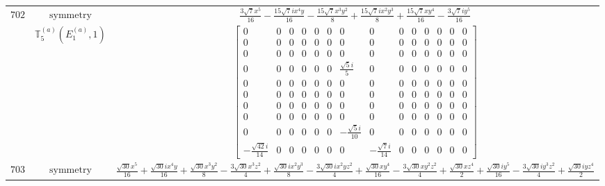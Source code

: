 \documentclass[fleqn,8pt,landscape]{jsarticle}
\begin{document}
\begin{longtable}{ccc}
$ 702 $ & $ \text{symmetry} $ & $ \frac{3 \sqrt{7} x^{5}}{16} - \frac{15 \sqrt{7} i x^{4} y}{16} - \frac{15 \sqrt{7} x^{3} y^{2}}{8} + \frac{15 \sqrt{7} i x^{2} y^{3}}{8} + \frac{15 \sqrt{7} x y^{4}}{16} - \frac{3 \sqrt{7} i y^{5}}{16} $ \\
$  $ & $ \mathbb{T}_{5}^{(a)}(E_{1}^{(a)},1) $ & $ \begin{bmatrix} 0 & 0 & 0 & 0 & 0 & 0 & 0 & 0 & 0 & 0 & 0 & 0 & 0 & 0 \\ 0 & 0 & 0 & 0 & 0 & 0 & 0 & 0 & 0 & 0 & 0 & 0 & 0 & 0 \\ 0 & 0 & 0 & 0 & 0 & 0 & 0 & 0 & 0 & 0 & 0 & 0 & 0 & 0 \\ 0 & 0 & 0 & 0 & 0 & 0 & \frac{\sqrt{5} i}{5} & 0 & 0 & 0 & 0 & 0 & 0 & 0 \\ 0 & 0 & 0 & 0 & 0 & 0 & 0 & 0 & 0 & 0 & 0 & 0 & 0 & 0 \\ 0 & 0 & 0 & 0 & 0 & 0 & 0 & 0 & 0 & 0 & 0 & 0 & 0 & 0 \\ 0 & 0 & 0 & 0 & 0 & 0 & 0 & 0 & 0 & 0 & 0 & 0 & 0 & 0 \\ 0 & 0 & 0 & 0 & 0 & 0 & 0 & 0 & 0 & 0 & 0 & 0 & 0 & 0 \\ 0 & 0 & 0 & 0 & 0 & 0 & - \frac{\sqrt{5} i}{10} & 0 & 0 & 0 & 0 & 0 & 0 & 0 \\ - \frac{\sqrt{42} i}{14} & 0 & 0 & 0 & 0 & 0 & 0 & - \frac{\sqrt{7} i}{14} & 0 & 0 & 0 & 0 & 0 & 0 \end{bmatrix} $ \\ \hline
$ 703 $ & $ \text{symmetry} $ & $ \frac{\sqrt{30} x^{5}}{16} + \frac{\sqrt{30} i x^{4} y}{16} + \frac{\sqrt{30} x^{3} y^{2}}{8} - \frac{3 \sqrt{30} x^{3} z^{2}}{4} + \frac{\sqrt{30} i x^{2} y^{3}}{8} - \frac{3 \sqrt{30} i x^{2} y z^{2}}{4} + \frac{\sqrt{30} x y^{4}}{16} - \frac{3 \sqrt{30} x y^{2} z^{2}}{4} + \frac{\sqrt{30} x z^{4}}{2} + \frac{\sqrt{30} i y^{5}}{16} - \frac{3 \sqrt{30} i y^{3} z^{2}}{4} + \frac{\sqrt{30} i y z^{4}}{2} $ \\

\end{longtable}
\end{document}
